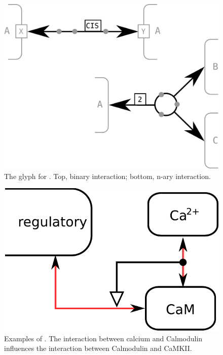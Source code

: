 \begin{figure}[H]
  \centering
  \includegraphics[scale = 0.3]{images/interaction}
  \caption{The \ER glyph for . Top, binary interaction; bottom, n-ary interaction.}
  \label{fig:interaction}
\end{figure}

\begin{figure}[H]
  \centering
  \includegraphics[scale = 0.5]{examples/ex-interaction}
  \caption{Examples of . The interaction between calcium and Calmodulin influences the interaction between Calmodulin and CaMKII.}
  \label{fig:ex-interaction}
\end{figure}



\normalcolor